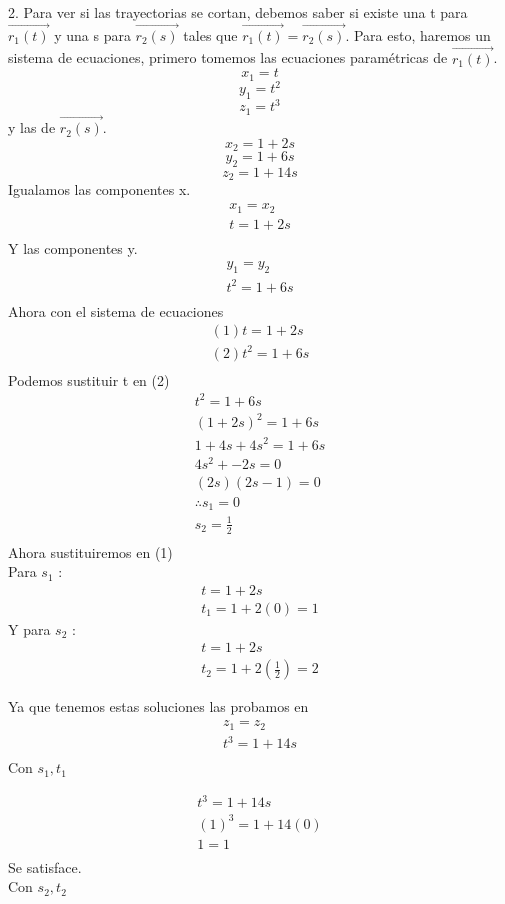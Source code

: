\documentclass[12pt]{article}
\begin{document}
 2. Para ver si las trayectorias se cortan, debemos saber si existe una t para $\vec{r_1(t)}$ y una s para $\vec{r_2(s)}$ tales que $\vec{r_1(t)} = \vec{r_2(s)}$.
 Para esto, haremos un sistema de ecuaciones, primero tomemos las ecuaciones paramétricas de $\vec{r_1(t)}$.
 \[ x_1 = t\]
\[ y_1 = t^2\]
\[ z_1 = t^3\]
y las de $\vec{r_2(s)}$.
\[ x_2 = 1+2s\]
\[ y_2 = 1+6s\]
\[ z_2 = 1+14s\]
Igualamos las componentes x.
\begin{align*}
   x_1 = x_2 \\
   t =  1+2s \\
\end{align*}
Y las componentes y.
\begin{align*}
   y_1 = y_2 \\
   t^2 =  1+6s \\
\end{align*}
Ahora con el sistema de ecuaciones
\begin{align*}
   (1) t =  1+2s \\
   (2) t^2 =  1+6s \\
\end{align*}
Podemos sustituir t en (2)
\begin{align*}
   t^2 =  1+6s \\
   (1+2s)^2= 1+6s \\
   1+4s+4s^2 = 1 + 6s \\
   4s^2 + -2s = 0 \\
   (2s)(2s-1) = 0 \\
   \therefore s_1 = 0 \\
   s_2 = \frac{1}{2} \\
\end{align*}
Ahora sustituiremos en (1)
\\
Para $s_1$ :
\begin{align*}
    t =  1+2s \\
   t_1 = 1 + 2 (0) = 1
\end{align*}
Y para $s_2$ :
\begin{align*}
    t =  1+2s \\
   t_2 = 1 + 2 \left(\frac{1}{2} \right) = 2
\end{align*}

Ya que tenemos estas soluciones las probamos en 
\begin{align*}
   z_1 = z_2 \\
   t^3 =  1+14s \\
\end{align*}
Con $s_1, t_1$

\begin{align*}
  t^3 =  1+14s \\
  (1)^3 =  1+14(0)  \\
  1 =  1  \\
\end{align*}
Se satisface. \\
Con $s_2, t_2$
\end{document}
